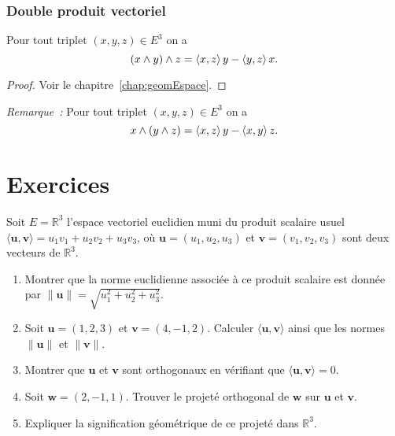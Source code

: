 \subsubsection{Double produit vectoriel}

\begin{theo}
  Pour tout triplet \((x,y,z) \in E^3\) on a
  \begin{equation}
    (x \wedge y)\wedge z = \left\langle{x},{z}\right\rangle y-\left\langle{y},{z}\right\rangle x.
  \end{equation}
\end{theo}
\begin{proof}
  Voir le chapitre~\ref{chap:geomEspace}.
\end{proof}
\emph{Remarque~:} Pour tout triplet \((x,y,z) \in E^3\) on a
\begin{equation}
  x \wedge (y \wedge z) = \left\langle{x},{z}\right\rangle y-\left\langle{x},{y}\right\rangle z.
\end{equation}
\section{Exercices}
\begin{exercice}
Soit \( E = \mathbb{R}^3 \) l'espace vectoriel euclidien muni du produit scalaire usuel \( \langle \mathbf{u}, \mathbf{v} \rangle = u_1 v_1 + u_2 v_2 + u_3 v_3 \), où \( \mathbf{u} = (u_1, u_2, u_3) \) et \( \mathbf{v} = (v_1, v_2, v_3) \) sont deux vecteurs de \( \mathbb{R}^3 \).

\begin{enumerate}
    \item Montrer que la norme euclidienne associée à ce produit scalaire est donnée par \( \| \mathbf{u} \| = \sqrt{u_1^2 + u_2^2 + u_3^2} \).
    \item Soit \( \mathbf{u} = (1, 2, 3) \) et \( \mathbf{v} = (4, -1, 2) \). Calculer \( \langle \mathbf{u}, \mathbf{v} \rangle \) ainsi que les normes \( \| \mathbf{u} \| \) et \( \| \mathbf{v} \| \).
    \item Montrer que \( \mathbf{u} \) et \( \mathbf{v} \) sont orthogonaux en vérifiant que \( \langle \mathbf{u}, \mathbf{v} \rangle = 0 \).
    \item Soit \( \mathbf{w} = (2, -1, 1) \). Trouver le projeté orthogonal de \( \mathbf{w} \) sur \( \mathbf{u} \) et \( \mathbf{v} \).
    \item Expliquer la signification géométrique de ce projeté dans \( \mathbb{R}^3 \).
\end{enumerate}
\end{exercice}

